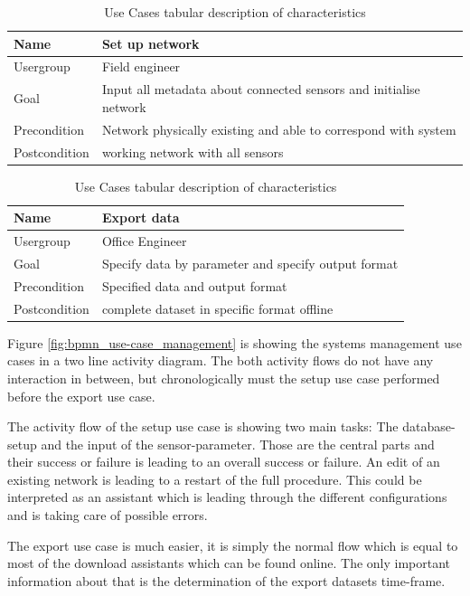 \begin{table}[H]
\centering
\begin{tabular}{l | p{11cm}}
Name & Set up network\\ \hline 
Usergroup & Field engineer\\ \hline 
Goal & Input all metadata about connected sensors and initialise network\\ \hline 
Precondition & Network physically existing and able to correspond with system\\ \hline 
Postcondition & working network with all sensors\\ 
\end{tabular}
\caption{Use Cases tabular description of characteristics} 
\label{table:use case description of "Set up network"}
\end{table}

\begin{table}[H]
\centering
\begin{tabular}{l | p{11cm}}
Name & Export data\\ \hline 
Usergroup & Office Engineer\\ \hline 
Goal & Specify data by parameter and specify output format\\ \hline 
Precondition & Specified data and output format\\ \hline 
Postcondition & complete dataset in specific format offline\\ 
\end{tabular}
\caption{Use Cases tabular description of characteristics} 
\label{table:use case description of "Export data"}
\end{table}

Figure \ref{fig:bpmn_use-case_management} is showing the systems management use cases in a two line activity diagram. The both activity flows do not have any interaction in between, but chronologically must the setup use case performed before the export use case.

The activity flow of the setup use case is showing two main tasks: The database-setup and the input of the sensor-parameter. Those are the central parts and their success or failure is leading to an overall success or failure. An edit of an existing network is leading to a restart of the full procedure. This could be interpreted as an assistant which is leading through the different configurations and is taking care of possible errors.

The export use case is much easier, it is simply the normal flow which is equal to most of the download assistants which can be found online. The only important information about that is the determination of the export datasets time-frame.


